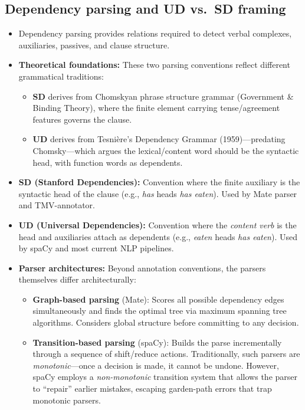 \documentclass[11pt]{article}
\begin{document}
\subsection{Dependency parsing and UD vs.\ SD framing}
\begin{itemize}
  \item Dependency parsing provides relations required to detect verbal complexes, auxiliaries, passives, and clause structure. \citep{Nivre2010DependencyParsing}
  \item \textbf{Theoretical foundations:} These two parsing conventions reflect different grammatical traditions:
    \begin{itemize}
      \item \textbf{SD} derives from Chomskyan phrase structure grammar (Government \& Binding Theory), where the finite element carrying tense/agreement features governs the clause. \citep{Chomsky1988LecturesLectures}
      \item \textbf{UD} derives from Tesni\`{e}re's Dependency Grammar (1959)---predating Chomsky---which argues the lexical/content word should be the syntactic head, with function words as dependents. \citep{Tesniere2015ElementsSyntax}
    \end{itemize}
  \item \textbf{SD (Stanford Dependencies):} Convention where the finite auxiliary is the syntactic head of the clause (e.g., \emph{has} heads \emph{has eaten}). Used by Mate parser and TMV-annotator. \citep{DeMarneffeGeneratingParses,Ramm2017AnnotatingGerman}
  \item \textbf{UD (Universal Dependencies):} Convention where the \emph{content verb} is the head and auxiliaries attach as dependents (e.g., \emph{eaten} heads \emph{has eaten}). Used by spaCy and most current NLP pipelines. \citep{Nivre2020UniversalCollection,deMarneffeUniversalTypology}
  \item \textbf{Parser architectures:} Beyond annotation conventions, the parsers themselves differ architecturally:
    \begin{itemize}
      \item \textbf{Graph-based parsing} (Mate): Scores all possible dependency edges simultaneously and finds the optimal tree via maximum spanning tree algorithms. Considers global structure before committing to any decision. \citep{Nivre2010DependencyParsing}
      \item \textbf{Transition-based parsing} (spaCy): Builds the parse incrementally through a sequence of shift/reduce actions. Traditionally, such parsers are \emph{monotonic}---once a decision is made, it cannot be undone. However, spaCy employs a \emph{non-monotonic} transition system that allows the parser to ``repair'' earlier mistakes, escaping garden-path errors that trap monotonic parsers. \citep{Vasiliev2020NaturalIntroduction}

\end{itemize}
\end{itemize}
\end{document}
